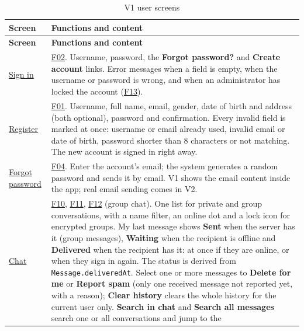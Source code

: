 \begingroup
\small
\begin{longtable}{|L{4.3cm}|L{\dimexpr\textwidth-4.3cm-4\arrayrulewidth\relax}|}
  \caption{V1 user screens}
  \label{tab:user-screen-map}\\
  \hline
  \textbf{Screen} & \textbf{Functions and content}\\
  \hline
  \endfirsthead
  \hline
  \textbf{Screen} & \textbf{Functions and content}\\
  \hline
  \endhead
  \href{https://www.figma.com/design/maCogjZs9eOOhfkxsOZoIU?node-id=129-929}{Sign in}
  & \hyperlink{F02}{F02}. Username, password, the \textbf{Forgot password?} and
  \textbf{Create account} links. Error messages when a field is empty, when the
  username or password is wrong, and when an administrator has locked the account
  (\hyperlink{F13}{F13}).\\
  \hline
  \href{https://www.figma.com/design/maCogjZs9eOOhfkxsOZoIU?node-id=129-929}{Register}
  & \hyperlink{F01}{F01}. Username, full name, email, gender, date of birth and
  address (both optional), password and confirmation. Every invalid field is marked
  at once: username or email already used, invalid email or date of birth, password
  shorter than 8 characters or not matching. The new account is signed in right
  away.\\
  \hline
  \href{https://www.figma.com/design/maCogjZs9eOOhfkxsOZoIU?node-id=129-929}{Forgot password}
  & \hyperlink{F04}{F04}. Enter the account's email; the system generates a random
  password and sends it by email. V1 shows the email content inside the app; real
  email sending comes in V2.\\
  \hline
  \href{https://www.figma.com/design/maCogjZs9eOOhfkxsOZoIU?node-id=129-930}{Chat}
  & \hyperlink{F10}{F10}, \hyperlink{F11}{F11}, \hyperlink{F12}{F12} (group chat).
  One list for private and group conversations, with a name filter, an online dot
  and a lock icon for encrypted groups. My last message shows \textbf{Sent} when the
  server has it (group messages), \textbf{Waiting} when the recipient is offline and
  \textbf{Delivered} when the recipient has it: at once if they are online, or when
  they sign in again. The status is derived from \texttt{Message.deliveredAt}.
  Select one or more messages to \textbf{Delete for me} or \textbf{Report spam} (only
  one received message not reported yet, with a reason); \textbf{Clear history}
  clears the whole history for the current user only. \textbf{Search in chat} and
  \textbf{Search all messages} search one or all conversations and jump to the

\end{longtable}
